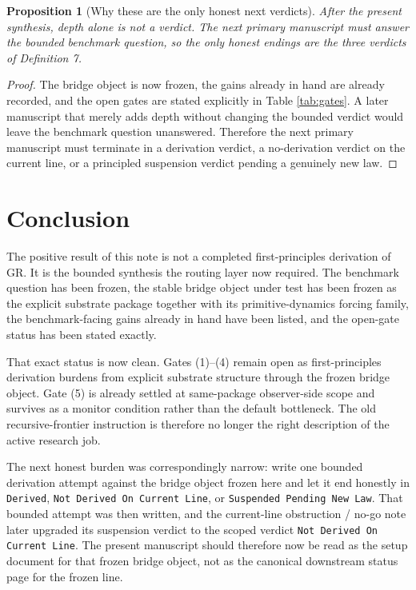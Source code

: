 \documentclass[11pt]{article}
\newtheorem{proposition}{Proposition}
\begin{document}
\begin{proposition}[Why these are the only honest next verdicts]
After the present synthesis, depth alone is not a verdict. The next primary manuscript must answer the bounded benchmark question, so the only honest endings are the three verdicts of Definition 7.
\end{proposition}

\begin{proof}
The bridge object is now frozen, the gains already in hand are already recorded, and the open gates are stated explicitly in Table \ref{tab:gates}. A later manuscript that merely adds depth without changing the bounded verdict would leave the benchmark question unanswered. Therefore the next primary manuscript must terminate in a derivation verdict, a no-derivation verdict on the current line, or a principled suspension verdict pending a genuinely new law.
\end{proof}

\section{Conclusion}

The positive result of this note is not a completed first-principles derivation of GR. It is the bounded synthesis the routing layer now required. The benchmark question has been frozen, the stable bridge object under test has been frozen as the explicit substrate package together with its primitive-dynamics forcing family, the benchmark-facing gains already in hand have been listed, and the open-gate status has been stated exactly.

That exact status is now clean. Gates (1)--(4) remain open as first-principles derivation burdens from explicit substrate structure through the frozen bridge object. Gate (5) is already settled at same-package observer-side scope and survives as a monitor condition rather than the default bottleneck. The old recursive-frontier instruction is therefore no longer the right description of the active research job.

The next honest burden was correspondingly narrow: write one bounded derivation attempt against the bridge object frozen here and let it end honestly in \texttt{Derived}, \texttt{Not Derived On Current Line}, or \texttt{Suspended Pending New Law}. That bounded attempt was then written, and the current-line obstruction / no-go note later upgraded its suspension verdict to the scoped verdict \texttt{Not Derived On Current Line}. The present manuscript should therefore now be read as the setup document for that frozen bridge object, not as the canonical downstream status page for the frozen line.
\end{document}
